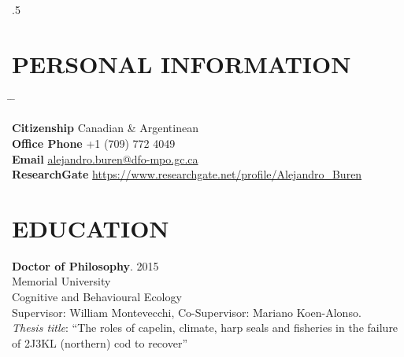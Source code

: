 \documentclass{res}
\begin{document}
 
\thispagestyle{empty} %
\address{Research Scientist\\
Fisheries and Oceans Canada\\
Northwest Atlantic Fisheries Centre}


\begin{resume}
\vspace{0.3in}
\moveleft.5\sectionwidth\centerline{ }  

\section{PERSONAL INFORMATION}

\parbox{0.5\textwidth}{ %
	\begin{tabbing} %
		\hspace{3cm} \= \hspace{4cm} \= \kill %
		
		{\bf Citizenship} \> Canadian \& Argentinean \\%
		
	    {\bf Office Phone} \> +1 (709) 772 4049 \\ %
		
	
		{\bf Email} \> \href{mailto:alejandro.buren@dfo-mpo.gc.ca}{alejandro.buren@dfo-mpo.gc.ca}\\
		 
		{\bf ResearchGate} \> \url{https://www.researchgate.net/profile/Alejandro_Buren}
    \end{tabbing}
}
\hfill 

\section{EDUCATION}
\vspace{0.1in} 
 
\textbf{Doctor of Philosophy}. 2015 \\
Memorial University \\
Cognitive and Behavioural Ecology \\
Supervisor: William Montevecchi, Co-Supervisor: Mariano Koen-Alonso.\\
\textit{Thesis title}: “The roles of capelin, climate, harp seals and fisheries in the failure of 2J3KL (northern) cod to recover”


\end{resume}
\end{document}
